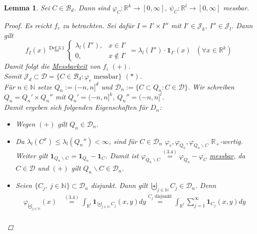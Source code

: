 \documentclass[a4paper]{report}
\newcommand{\doubleOne}{\textbf{1}}
\newcommand{\R}{\mathbb{R}}
\newcommand{\N}{\mathbb{N}}
\newcommand{\Borel}{\mathcal{B}}
\newcommand{\Bd}{\Borel_d}
\newcommand{\Jd}{\mathcal{J}_d}
\newcommand{\bigdcup}{\biguplus}
\newcommand{\jlabel}[1]{\label{j_#1}}
\newcommand{\jshortlink}[1]{\jhyperref{#1}{\text{#1}}}
\newcommand{\jhyperref}[2]{\hyperref[j_#1]{#2}}
\newcommand{\jlink}[1]{\jhyperref{#1}{#1}}
\newcommand{\jabb}[3]{ #1: #2 \rightarrow #3 }
\theoremstyle{plain}
\newtheorem{lem}[thm]{Lemma}
\theoremstyle{definition}
\begin{document}
{{{{\begin{lem}
\jlabel{Lem 3.19}
    Sei $C\in\Bd$. Dann sind $\jabb{\varphi_C}{\R^k}{[0,\infty]}$, $\jabb{\psi_C}{\R^l}{[0,\infty]}$ messbar.
    \begin{proof}
        Es reicht $f_c$ zu betrachten. Sei dafür $I = I'\times I''$ mit $I'\in \mathcal{J}_k,\ I''\in \mathcal{J}_l$. Dann gilt
        \begin{displaymath}
            f_I(x) \overset{\jshortlink{Def 3.1}}{=} \begin{cases} \lambda_l(I''), & x\in I' \\ 0, &x\notin I'  \end{cases} = \lambda_l(I'')\cdot \doubleOne_{I'}(x) \ \ \ (\forall x\in \R^k)
        \end{displaymath}
        Damit folgt die \hyperref[j_messbar]{Messbarkeit} von $f_i$ $(+)$.\\
        Somit $\Jd \subset \mathcal{D} = \{C\in \Bd : \varphi_c \text{ messbar}\}$ $(*)$.\\
        Für $n\in\N$ setze $Q_n := (-n,n]^d$ und $\mathcal{D}_n := \{C \subset Q_n : C \in \mathcal{D}\}$. Wir schreiben $Q_n = Q_n' \times Q_n''$ mit $Q_n' = (-n,n]^k, \ Q_n'' = (-n,n]^l$.\\
        Damit ergeben sich folgenden Eigenschaften für $D_n$:
        \begin{itemize}
            \item[(A1)] Wegen $(+)$ gilt $Q_n \in \mathcal{D}_n$.
            \item[(A2)] 
                Da $\lambda_l(C^x) \le \lambda_l(Q_n'') < \infty$, sind für $C\in \mathcal{D}_n$ $\varphi_c,\varphi_{Q_n},\varphi_{Q_n\backslash C}$ $\R_+$-wertig.\\
                Weiter gilt $\doubleOne_{Q_n\backslash C} = \doubleOne_{Q_n} - \doubleOne_C$. Damit ist $\varphi_{Q_n\backslash C} \overset{\jlink{(3.4)}}{=} \varphi_{Q_n} - \varphi_C$ \jlink{messbar}, da $C\in \mathcal{D}$ und $(+)$ gilt $Q_n \backslash C \in \mathcal{D}_n$.
            \item[(A3')]
                Seien $\{C_j,\ j\in \N\} \subset\mathcal{D}_n$ disjunkt. Dann gilt $\bigdcup_{j\in \N}C_j \in \mathcal{D}_n$. Denn
                \begin{displaymath}
                    \begin{split}
                        \varphi_{\bigdcup_{j\in\N}}(x) &\overset{\jlink{(3.4)}}{=} \int_{\R^l} \doubleOne_{\bigdcup_{j\in\N}C_j}(x,y)dy \overset{C_j\text{ disjunkt}}{=} \int_{\R^l}\sum_{j=1}^\infty \doubleOne_{C_j}(x,y) dy \\

\end{split}
\end{displaymath}
\end{itemize}
\end{proof}
\end{lem}}}}}
\end{document}
